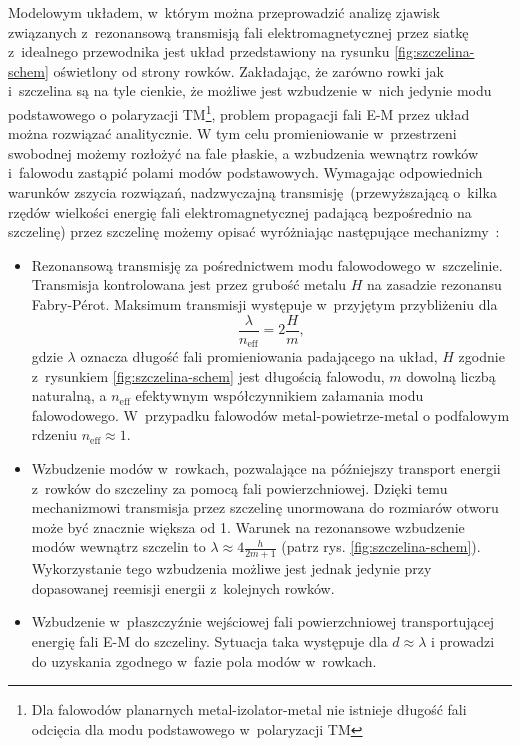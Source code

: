 Modelowym układem, w~którym można przeprowadzić analizę zjawisk związanych z~rezonansową transmisją fali elektromagnetycznej przez siatkę z~idealnego przewodnika jest układ przedstawiony na rysunku \ref{fig:szczelina-schem} oświetlony od strony rowków. Zakładając, że zarówno rowki jak i~szczelina są na tyle cienkie, że możliwe jest wzbudzenie w~nich jedynie modu podstawowego o polaryzacji TM\footnote{Dla falowodów planarnych metal-izolator-metal nie istnieje długość fali odcięcia dla modu podstawowego w~polaryzacji TM}, problem propagacji fali E-M przez układ można rozwiązać analitycznie. W tym celu promieniowanie w~przestrzeni swobodnej możemy rozłożyć na fale płaskie, a wzbudzenia wewnątrz rowków i~falowodu zastąpić polami modów podstawowych. Wymagając odpowiednich warunków zszycia rozwiązań, nadzwyczajną transmisję~(przewyższającą o~kilka rzędów wielkości energię fali elektromagnetycznej padającą bezpośrednio na szczelinę) przez szczelinę możemy opisać wyróżniając następujące mechanizmy~\cite{martin2001theory}:
\begin{itemize}
	\item Rezonansową transmisję za pośrednictwem modu falowodowego w~szczelinie. Transmisja kontrolowana jest przez grubość metalu $H$ na zasadzie rezonansu Fabry-P\'{e}rot. Maksimum transmisji występuje w~przyjętym przybliżeniu dla
\begin{equation}
\frac{\lambda}{n_{\textrm{eff}}} = 2 \frac {H}{m},
\label{eq:fp-szczelina}
\end{equation}
gdzie $\lambda$ oznacza długość fali promieniowania padającego na układ, $H$ zgodnie z~rysunkiem \ref{fig:szczelina-schem} jest długością falowodu, $m$ dowolną liczbą naturalną, a $n_{\textrm{eff}}$ efektywnym współczynnikiem załamania modu falowodowego. W~przypadku falowodów metal-powietrze-metal o podfalowym rdzeniu $n_{\textrm{eff}} \approx 1$.
	\item Wzbudzenie modów w~rowkach, pozwalające na późniejszy transport energii z~rowków do szczeliny za pomocą fali powierzchniowej. Dzięki temu mechanizmowi transmisja przez szczelinę unormowana do rozmiarów otworu może być znacznie większa od 1. Warunek na rezonansowe wzbudzenie modów wewnątrz szczelin to $\lambda \approx 4 \frac {h}{2m+1}$ (patrz rys. \ref{fig:szczelina-schem}). Wykorzystanie tego wzbudzenia możliwe jest jednak jedynie przy dopasowanej reemisji energii z~kolejnych rowków.
	\item  Wzbudzenie w~płaszczyźnie wejściowej fali powierzchniowej transportującej energię fali E-M do szczeliny. Sytuacja taka występuje dla $d \approx \lambda$ i prowadzi do uzyskania zgodnego w~fazie pola modów w~rowkach.
\end{itemize}

